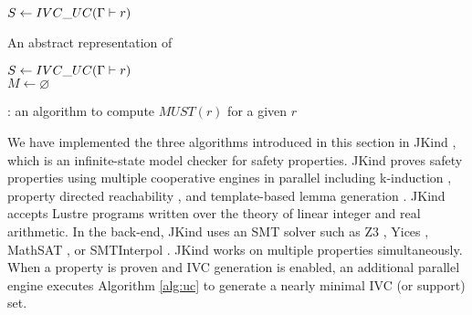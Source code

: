 \begin{algorithm}
  \BlankLine
  $S \leftarrow {IVC\_UC}(\Gamma \vdash r)$ \\
   {
  }
\caption{An abstract representation of \ucbfalg \cite{Ghass16}}
\label{alg:ucbf}
\end{algorithm}


\begin{algorithm}
  \BlankLine
  $S \leftarrow {IVC\_UC}(\Gamma \vdash r)$ \\
  $M \leftarrow \varnothing$ \\
   {
  }
\caption{\mustalg: an algorithm to compute $MUST(r)$ for a given $r$}
\label{alg:must}
\end{algorithm} 

We have implemented the three algorithms introduced in this section in JKind \cite{jkind}, which is an infinite-state model checker for safety properties. JKind proves safety properties using multiple cooperative engines in parallel including k-induction \cite{SheeranSS00}, property directed reachability \cite{Een2011:PDR}, and template-based lemma generation \cite{Kahsai2011}. JKind accepts
Lustre programs written over the theory of linear integer and real
arithmetic. In the back-end, JKind uses an SMT solver such as
Z3 \cite{DeMoura08:z3}, Yices \cite{Dutertre06:yices},
MathSAT \cite{Cimatti2013:MathSAT}, or SMTInterpol \cite{Christ2012:SMTInterpol}.
JKind works on multiple properties simultaneously. When a
property is proven and IVC generation is enabled, an additional
parallel engine executes Algorithm \ref{alg:uc} to generate a nearly minimal
IVC (or support) set.
